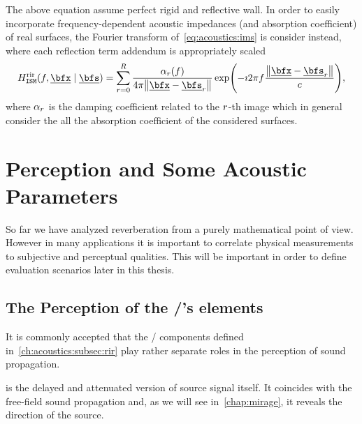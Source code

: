 The above equation assume perfect rigid and reflective wall.
In order to easily incorporate frequency-dependent acoustic impedances (and absorption coefficient)
of real surfaces, the Fourier transform of~\cref{eq:acoustics:ims} is consider instead, where
each reflection term addendum is appropriately scaled
\begin{equation}
    \label{eq:acoustics:ims}
    \rirFreq_{\mathtt{ISM}}(f, \positionMicrophone \mid \positionSource) =
        \sum_{\idxEch=0}^{\numEchs} \frac{\absCoeff_{\idxEch}(f)}{4 \pi \norm{\positionMicrophone - \positionSource_\idxEch}}
        \exp\kparen{- \Ii 2 \pi f \frac{\norm{\positionMicrophone - \positionSource_\idxEch}}{\speedOfSound}}
        ,
\end{equation}
where $\alpha_{r}$ is the damping coefficient related to the $r$-th image which in general
consider the all the absorption coefficient of the considered surfaces.


\section{Perception and Some Acoustic Parameters}\label{ch:acoustics:sec:perception}
So far we have analyzed reverberation from a purely mathematical point of view.
However in many applications it is important to correlate physical measurements to subjective and perceptual qualities.
This will be important in order to define evaluation scenarios later in this thesis.
\subsection{The Perception of the \RIR/'s elements}
It is commonly accepted that the \RIR/ components defined in~\cref{ch:acoustics:subsec:rir} play rather separate roles in the perception of sound propagation.

 is the delayed and attenuated version of source signal itself.
It coincides with the free-field sound propagation and, as we will see in~\cref{chap:mirage}, it reveals the direction of the source.

